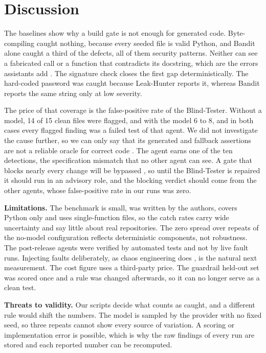 \documentclass[12pt,onecolumn,draftclsnofoot]{IEEEtran}
\begin{document}
\section{Discussion}
The baselines show why a build gate is not enough for generated code. Byte-compiling caught nothing, because every seeded file is valid Python, and Bandit alone caught a third of the defects, all of them security patterns. Neither can see a fabricated call or a function that contradicts its docstring, which are the errors assistants add \cite{spracklen2025}. The signature check closes the first gap deterministically. The hard-coded password was caught because Leak-Hunter reports it, whereas Bandit reports the same string only at low severity.

The price of that coverage is the false-positive rate of the Blind-Tester. Without a model, 14 of 15 clean files were flagged, and with the model 6 to 8, and in both cases every flagged finding was a failed test of that agent. We did not investigate the cause further, so we can only say that its generated and fallback assertions are not a reliable oracle for correct code \cite{barr2015}. The agent earns one of the ten detections, the specification mismatch that no other agent can see. A gate that blocks nearly every change will be bypassed \cite{johnson2013}, so until the Blind-Tester is repaired it should run in an advisory role, and the blocking verdict should come from the other agents, whose false-positive rate in our runs was zero.

\textbf{Limitations.} The benchmark is small, was written by the authors, covers Python only and uses single-function files, so the catch rates carry wide uncertainty and say little about real repositories. The zero spread over repeats of the no-model configuration reflects deterministic components, not robustness. The post-release agents were verified by automated tests and not by live fault runs. Injecting faults deliberately, as chaos engineering does \cite{basiri2016}, is the natural next measurement. The cost figure uses a third-party price. The guardrail held-out set was scored once and a rule was changed afterwards, so it can no longer serve as a clean test.

\textbf{Threats to validity.} Our scripts decide what counts as caught, and a different rule would shift the numbers. The model is sampled by the provider with no fixed seed, so three repeats cannot show every source of variation. A scoring or implementation error is possible, which is why the raw findings of every run are stored and each reported number can be recomputed.
\end{document}
